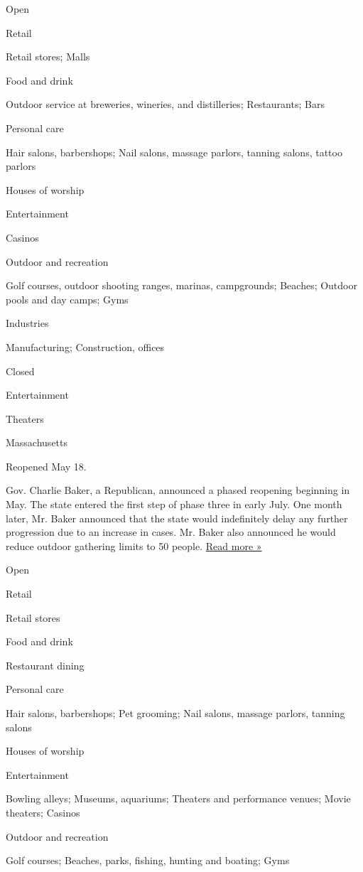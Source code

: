 Open

Retail

Retail stores; Malls

Food and drink

Outdoor service at breweries, wineries, and distilleries; Restaurants;
Bars

Personal care

Hair salons, barbershops; Nail salons, massage parlors, tanning salons,
tattoo parlors

Houses of worship

Entertainment

Casinos

Outdoor and recreation

Golf courses, outdoor shooting ranges, marinas, campgrounds; Beaches;
Outdoor pools and day camps; Gyms

Industries

Manufacturing; Construction, offices

Closed

Entertainment

Theaters

Massachusetts

Reopened May 18.

Gov. Charlie Baker, a Republican, announced a phased reopening beginning
in May. The state entered the first step of phase three in early July.
One month later, Mr. Baker announced that the state would indefinitely
delay any further progression due to an increase in cases. Mr. Baker
also announced he would reduce outdoor gathering limits to 50 people.
\href{https://www.bostonglobe.com/2020/08/07/nation/baker-reduces-limit-outdoor-gatherings-50-people/}{Read
more »}

Open

Retail

Retail stores

Food and drink

Restaurant dining

Personal care

Hair salons, barbershops; Pet grooming; Nail salons, massage parlors,
tanning salons

Houses of worship

Entertainment

Bowling alleys; Museums, aquariums; Theaters and performance venues;
Movie theaters; Casinos

Outdoor and recreation

Golf courses; Beaches, parks, fishing, hunting and boating; Gyms

